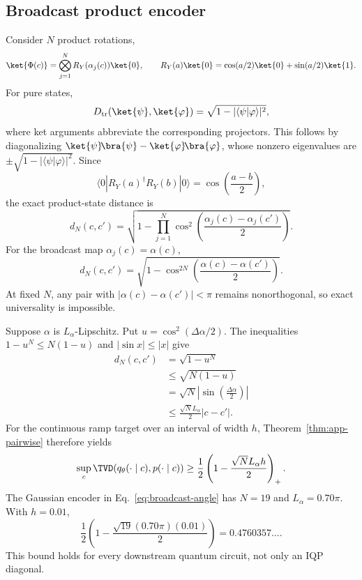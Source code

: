 \subsection{Broadcast product encoder}

Consider $N$ product rotations,
\begin{equation}
 \ket{\Phi(c)}
 =\bigotimes_{j=1}^{N}R_Y(\alpha_j(c))\ket{0},
 \qquad
 R_Y(a)\ket{0}=\cos(a/2)\ket{0}+\sin(a/2)\ket{1}.
 \label{eq:app-product-encoder}
\end{equation}
For pure states,
\begin{equation}
 D_{\rm tr}(\ket{\psi},\ket{\varphi})
 =\sqrt{1-|\langle\psi|\varphi\rangle|^2},
 \label{eq:app-pure-trace}
\end{equation}
where ket arguments abbreviate the corresponding projectors. This follows
by diagonalizing
$\ket{\psi}\!\bra{\psi}-\ket{\varphi}\!\bra{\varphi}$, whose nonzero
eigenvalues are
$\pm\sqrt{1-|\langle\psi|\varphi\rangle|^2}$. Since
\begin{equation}
 \langle0|R_Y(a)^\dagger R_Y(b)|0\rangle
 =\cos\!\left(\frac{a-b}{2}\right),
\end{equation}
the exact product-state distance is
\begin{equation}
 d_N(c,c')
 =\sqrt{1-\prod_{j=1}^{N}
 \cos^2\!\left(\frac{\alpha_j(c)-\alpha_j(c')}{2}\right)}.
 \label{eq:app-product-distance}
\end{equation}
For the broadcast map $\alpha_j(c)=\alpha(c)$,
\begin{equation}
 d_N(c,c')
 =\sqrt{1-\cos^{2N}\!\left(
 \frac{\alpha(c)-\alpha(c')}{2}\right)}.
 \label{eq:app-broadcast-distance}
\end{equation}
At fixed $N$, any pair with
$|\alpha(c)-\alpha(c')|<\pi$ remains nonorthogonal, so exact universality is
impossible.

Suppose $\alpha$ is $L_\alpha$-Lipschitz. Put
$u=\cos^2(\Delta\alpha/2)$. The inequalities
$1-u^N\leq N(1-u)$ and $|\sin x|\leq|x|$ give
\begin{align}
 d_N(c,c')
 &=\sqrt{1-u^N}\\
 &\leq\sqrt{N(1-u)}\\
 &=\sqrt N\left|\sin\!\left(\frac{\Delta\alpha}{2}\right)\right|\\
 &\leq\frac{\sqrt N L_\alpha}{2}|c-c'|.
 \label{eq:app-broadcast-lipschitz}
\end{align}
For the continuous ramp target over an interval of width $h$,
Theorem~\ref{thm:app-pairwise} therefore yields
\begin{equation}
 \sup_c\TVD\!\left(q_\theta(\cdot\mid c),p(\cdot\mid c)\right)
 \geq
 \frac12\left(1-\frac{\sqrt N L_\alpha h}{2}\right)_+.
 \label{eq:app-sharp-ramp}
\end{equation}
The Gaussian encoder in Eq.~\eqref{eq:broadcast-angle} has
$N=19$ and $L_\alpha=0.70\pi$. With $h=0.01$,
\begin{equation}
 \frac12\left(
 1-\frac{\sqrt{19}(0.70\pi)(0.01)}{2}\right)
 =0.4760357\ldots.
 \label{eq:app-gaussian-number}
\end{equation}
This bound holds for every downstream quantum circuit, not only an IQP
diagonal.


